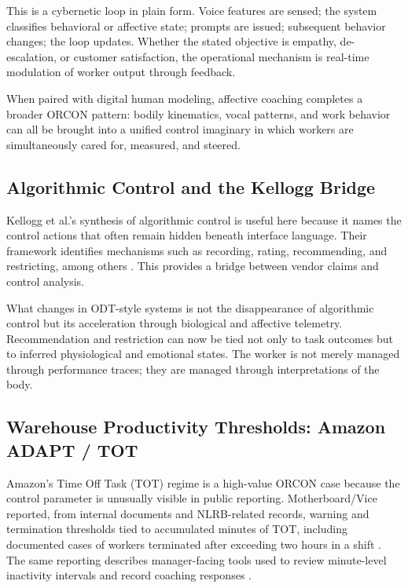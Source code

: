 \documentclass[runningheads]{llncs}
\begin{document}
This is a cybernetic loop in plain form. Voice features are sensed; the system classifies behavioral or affective state; prompts are issued; subsequent behavior changes; the loop updates. Whether the stated objective is empathy, de-escalation, or customer satisfaction, the operational mechanism is real-time modulation of worker output through feedback.

When paired with digital human modeling, affective coaching completes a broader ORCON pattern: bodily kinematics, vocal patterns, and work behavior can all be brought into a unified control imaginary in which workers are simultaneously cared for, measured, and steered.

\subsection{Algorithmic Control and the Kellogg Bridge}

Kellogg et al.'s synthesis of algorithmic control is useful here because it names the control actions that often remain hidden beneath interface language. Their framework identifies mechanisms such as recording, rating, recommending, and restricting, among others \cite{kellogg2020algorithms}. This provides a bridge between vendor claims and control analysis.

What changes in ODT-style systems is not the disappearance of algorithmic control but its acceleration through biological and affective telemetry. Recommendation and restriction can now be tied not only to task outcomes but to inferred physiological and emotional states. The worker is not merely managed through performance traces; they are managed through interpretations of the body.

\subsection{Warehouse Productivity Thresholds: Amazon ADAPT / TOT}

Amazon's Time Off Task (TOT) regime is a high-value ORCON case because the control parameter is unusually visible in public reporting. Motherboard/Vice reported, from internal documents and NLRB-related records, warning and termination thresholds tied to accumulated minutes of TOT, including documented cases of workers terminated after exceeding two hours in a shift \cite{gurley2022vice}. The same reporting describes manager-facing tools used to review minute-level inactivity intervals and record coaching responses \cite{gurley2022vice}.
\end{document}
